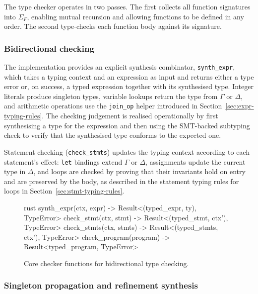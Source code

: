 The type checker operates in two passes. The first collects all function signatures into $\Sigma_F$, enabling mutual recursion and allowing functions to be defined in any order. The second type-checks each function body against its signature.

\subsubsection{Bidirectional checking}

The implementation provides an explicit synthesis combinator, \texttt{synth\_expr}, which takes a typing context and an expression as input and returns either a type error or, on success, a typed expression together with its synthesised type. Integer literals produce singleton types, variable lookups return the type from $\Gamma$ or $\Delta$, and arithmetic operations use the \texttt{join\_op} helper introduced in Section~\ref{sec:expr-typing-rules}. The checking judgement is realised operationally by first synthesising a type for the expression and then using the SMT-backed subtyping check to verify that the synthesised type conforms to the expected one.

Statement checking (\texttt{check\_stmts}) updates the typing context according to each statement's effect: \texttt{let} bindings extend $\Gamma$ or $\Delta$, assignments update the current type in $\Delta$, and loops are checked by proving that their invariants hold on entry and are preserved by the body, as described in the statement typing rules for loops in Section~\ref{sec:stmt-typing-rules}.

\begin{figure}[h]
\begin{center}
\begin{cminted}{rust}
synth_expr(ctx, expr) -> Result<(typed_expr, ty), TypeError>
check_stmt(ctx, stmt) -> Result<(typed_stmt, ctx'), TypeError>
check_stmts(ctx, stmts) -> Result<(typed_stmts, ctx'), TypeError>
check_program(program) -> Result<typed_program, TypeError>
\end{cminted}
\end{center}
\caption{Core checker functions for bidirectional type checking.}  
\end{figure}

\subsubsection{Singleton propagation and refinement synthesis}

